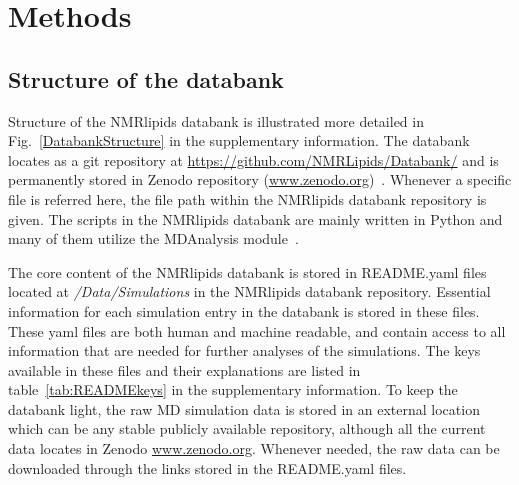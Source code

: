 \documentclass[fleqn,10pt]{wlscirep}
\begin{document}
\section{Methods}


\subsection{Structure of the databank}
Structure of the NMRlipids databank is illustrated more detailed in Fig.~\ref{DatabankStructure} in the supplementary information. The databank locates as a git repository at \url{https://github.com/NMRLipids/Databank/} and is permanently stored in Zenodo repository (\url{www.zenodo.org})~\cite{??}. Whenever a specific file is referred here, the file path within the NMRlipids databank repository is given. The scripts in the NMRlipids databank are mainly written in Python and many of them utilize the MDAnalysis module~\cite{gowers2019mdanalysis,michaud2011mdanalysis}.

The core content of the NMRlipids databank is stored in README.yaml files located at {\it /Data/Simulations} in the NMRlipids databank repository. Essential information for each simulation entry in the databank is stored in these files. These yaml files are both human and machine readable, and contain access to all information that are needed for further analyses of the simulations. The keys available in these files and their explanations are listed in table~\ref{tab:READMEkeys} in the supplementary information. To keep the databank light, the raw MD simulation data is stored in an external location which can be any stable publicly available repository, although all the current data locates in Zenodo \url{www.zenodo.org}. Whenever needed, the raw data can be downloaded through the links stored in the README.yaml files.  
\end{document}
